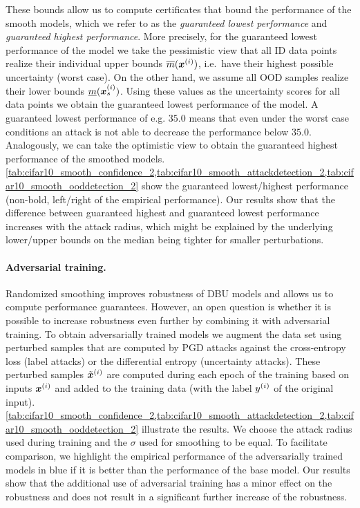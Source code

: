These bounds allow us to compute certificates that bound the performance of the smooth models, which we refer to as the \emph{guaranteed lowest performance} and \emph{guaranteed highest performance}. More precisely, for the guaranteed lowest performance of the model we take the pessimistic view that all ID data points realize their individual upper bounds $\overline{m}({\bm{x}}^{(i)})$, i.e.\ have their highest possible uncertainty (worst case). On the other hand, we assume all OOD samples realize their lower bounds $\underline{m}({\bm{x}}^{(i)}_s)$. Using these values as the uncertainty scores for all data points we obtain the guaranteed lowest performance of the model. 
A guaranteed lowest performance of e.g. $35.0$ means that even under the worst case conditions an attack is not able to decrease the performance below $35.0$. 
Analogously, we can take the optimistic view to obtain the guaranteed highest performance of the smoothed models. 
%
\cref{tab:cifar10_smooth_confidence_2,tab:cifar10_smooth_attackdetection_2,tab:cifar10_smooth_ooddetection_2} show the guaranteed lowest/highest performance (non-bold, left/right of the empirical performance). 
Our results show that the difference between guaranteed highest and guaranteed lowest performance increases with the attack radius, which might be explained by the underlying lower/upper bounds on the median being tighter for smaller perturbations. 
%


\paragraph{Adversarial training.}
Randomized smoothing improves robustness of DBU models and allows us to compute performance guarantees. However, an open question is whether it is possible to increase robustness even further by combining it with adversarial training. To obtain adversarially trained models we augment the data set using perturbed samples that are computed by PGD attacks against the cross-entropy loss (label attacks) or the differential entropy (uncertainty attacks). These perturbed samples $\tilde{{\bm{x}}}^{(i)}$ are computed during each epoch of the training based on inputs ${\bm{x}}^{(i)}$ and added to the training data (with the label $y^{(i)}$ of the original input). 
\cref{tab:cifar10_smooth_confidence_2,tab:cifar10_smooth_attackdetection_2,tab:cifar10_smooth_ooddetection_2} illustrate the results. We choose the attack radius used during training and the $\sigma$ used for smoothing to be equal. %
To facilitate comparison, we highlight the empirical performance of the adversarially trained models in blue if it is better than the performance of the base model. Our results show that the additional use of adversarial training has a minor effect on the robustness and does not result in a significant further increase of the robustness. 

